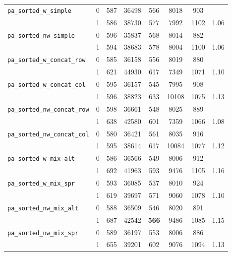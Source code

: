 \begin{table}[H]
\begin{tabular}{|l|c||c|c|c|c|c||c|}
		\verb|pa_sorted_w_simple| & 0 & 587 & 36498 & 566 & 8018 & 903 & \\ %
		& 1 &  586 & 38730 & 577 & 7992 & 1102 & 1.06 \\ \hline %

		\verb|pa_sorted_nw_simple| & 0 & 596 & 35837 & 568 & 8014 & 882 & \\ %
		& 1 &  594 & 38683 & 578 & 8004 & 1100 & 1.06 \\ \hline %

		\verb|pa_sorted_w_concat_row| & 0 & 585 & 36158 & 556 & 8019 & 880 & \\ %
		& 1 &  621 & 44930 & 617 & 7349 & 1071& 1.10 \\ \hline %

		\verb|pa_sorted_w_concat_col| & 0 & 595 & 36157 & 545 & 7995 & 908 &  \\ %
		& 1 &  596 & 38823 & 633 & 10108 & 1075 & 1.13 \\ \hline %

		\verb|pa_sorted_nw_concat_row| & 0 & 598 & 36661 & 548 & 8025 & 889 & \\ %
		& 1 & 638 & 42580 & 601 & 7359 & 1066 & 1.08 \\ \hline %

		\verb|pa_sorted_nw_concat_col| & 0 & 580 & 36421 & 561 & 8035 & 916 & \\ %
		& 1 & 595 & 38614 & 617 &  10084  & 1077 & 1.12 \\ \hline %

		\verb|pa_sorted_w_mix_alt| & 0 &  586 & 36566 & 549 & 8006  & 912 & \\ %
		& 1 & 692 & 41963 & 593 & 9476 & 1105 & 1.16 \\ \hline %

		\verb|pa_sorted_w_mix_spr| & 0 &  593 & 36085 &  537 & 8010 & 924 & \\ %
		& 1 & 619 & 39697 & 571 &  9060 & 1078 & 1.10 \\ \hline %

		\verb|pa_sorted_nw_mix_alt| & 0 & 588 & 36509 & 546 & 8020 & 891 & \\ %
		& 1 &  687 & 42542 & \textbf{566} & 9486 & 1085 & 1.15 \\ \hline %

		\verb|pa_sorted_nw_mix_spr| & 0 & 589 & 36197 & 553 & 8006  & 886 & \\ %
		& 1 &  655 & 39201 & 602 & 9076 & 1094 & 1.13 \\ \hline %


\end{tabular}
\end{table}
